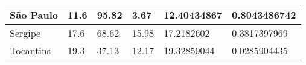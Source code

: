 \begin{table}[h]
{\begin{tabular}{|l|l|l|l|l|l|}
São Paulo           & 11.6                                              & 95.82                                   & 3.67                                       & 12.40434867                                        & 0.8043486742              \\ \hline
Sergipe             & 17.6                                              & 68.62                                   & 15.98                                      & 17.2182602                                         & 0.3817397969              \\ \hline
Tocantins           & 19.3                                              & 37.13                                   & 12.17                                      & 19.32859044                                        & 0.0285904435              \\ \hline
\end{tabular}%
}
\end{table}
